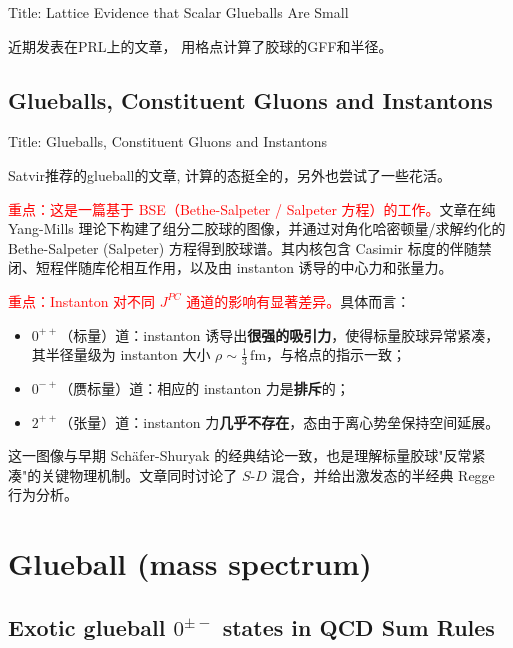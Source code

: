 \documentclass{article}
\begin{document}
Title: Lattice Evidence that Scalar Glueballs Are Small \cite{67xg-qxhz}


近期发表在PRL上的文章， 用格点计算了胶球的GFF和半径。 


\subsection{Glueballs, Constituent Gluons and Instantons}

Title: Glueballs, Constituent Gluons and Instantons \cite{shuryak2026glueballsconstituentgluonsinstantons}


Satvir推荐的glueball的文章, 计算的态挺全的，另外也尝试了一些花活。

\textcolor{red}{重点：这是一篇基于 BSE（Bethe-Salpeter / Salpeter 方程）的工作。}文章在纯 Yang-Mills 理论下构建了组分二胶球的图像，并通过对角化哈密顿量/求解约化的 Bethe-Salpeter (Salpeter) 方程得到胶球谱。其内核包含 Casimir 标度的伴随禁闭、短程伴随库伦相互作用，以及由 instanton 诱导的中心力和张量力。

\textcolor{red}{重点：Instanton 对不同 $J^{PC}$ 通道的影响有显著差异。}具体而言：
\begin{itemize}
    \item $0^{++}$（标量）道：instanton 诱导出\textbf{很强的吸引力}，使得标量胶球异常紧凑，其半径量级为 instanton 大小 $\rho\sim\frac{1}{3}\,\mathrm{fm}$，与格点的指示一致；
    \item $0^{-+}$（赝标量）道：相应的 instanton 力是\textbf{排斥}的；
    \item $2^{++}$（张量）道：instanton 力\textbf{几乎不存在}，态由于离心势垒保持空间延展。
\end{itemize}
这一图像与早期 Schäfer-Shuryak 的经典结论一致，也是理解标量胶球"反常紧凑"的关键物理机制。文章同时讨论了 $S$-$D$ 混合，并给出激发态的半经典 Regge 行为分析。 



















\section{Glueball (mass spectrum)}

\subsection{Exotic glueball $0^{\pm -}$ states in QCD Sum Rules}
\end{document}
